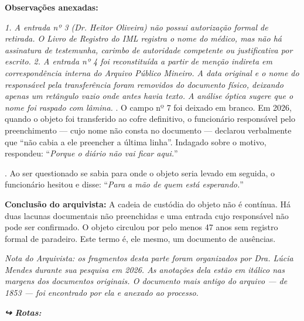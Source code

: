 \noindent \textbf{Observações anexadas:}

\noindent \textit{1. A entrada nº 3 (Dr. Heitor Oliveira) não possui autorização formal de retirada. O Livro de Registro do IML registra o nome do médico, mas não há assinatura de testemunha, carimbo de autoridade competente ou justificativa por escrito.}
\noindent \textit{2. A entrada nº 4 foi reconstituída a partir de menção indireta em correspondência interna do Arquivo Público Mineiro. A data original e o nome do responsável pela transferência foram removidos do documento físico, deixando apenas um retângulo vazio onde antes havia texto. A análise óptica sugere que o nome foi raspado com lâmina.}
. O campo nº 7 foi deixado em branco. Em 2026, quando o objeto foi transferido ao cofre definitivo, o funcionário responsável pelo preenchimento — cujo nome não consta no documento — declarou verbalmente que ``não cabia a ele preencher a última linha''. Indagado sobre o motivo, respondeu: \textquotedblleft{}\textit{Porque o diário não vai ficar aqui.}\textquotedblright{}

. Ao ser questionado se sabia para onde o objeto seria levado em seguida, o funcionário hesitou e disse: \textquotedblleft{}\textit{Para a mão de quem está esperando.}\textquotedblright{}

\noindent \textbf{Conclusão do arquivista:}
\noindent A cadeia de custódia do objeto não é contínua. Há duas lacunas documentais não preenchidas e uma entrada cujo responsável não pode ser confirmado. O objeto circulou por pelo menos 47 anos sem registro formal de paradeiro.
\noindent Este termo é, ele mesmo, um documento de ausências.

\noindent \textit{Nota do Arquivista: os fragmentos desta parte foram organizados por Dra. Lúcia Mendes durante sua pesquisa em 2026. As anotações dela estão em itálico nas margens dos documentos originais. O documento mais antigo do arquivo --- de 1853 --- foi encontrado por ela e anexado ao processo.}

\vspace{0.5em}
\noindent\textit{\textbf{↪ Rotas:}  \rotasep {}}